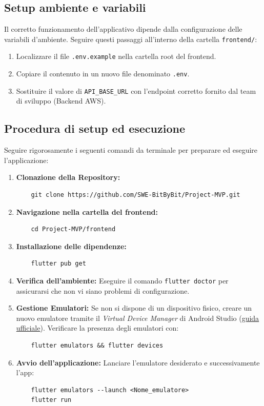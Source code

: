 \documentclass[a4paper,12pt]{article}
\begin{document}
\subsection{Setup ambiente e variabili} \label{subsec:setup_ambiente}
Il corretto funzionamento dell'applicativo dipende dalla configurazione delle variabili d'ambiente. Seguire questi passaggi all'interno della cartella \texttt{frontend/}:
\begin{enumerate}
    \item Localizzare il file \texttt{.env.example} nella cartella root del frontend.
    \item Copiare il contenuto in un nuovo file denominato \texttt{.env}.
    \item Sostituire il valore di \texttt{API\_BASE\_URL} con l'endpoint corretto fornito dal team di sviluppo (Backend AWS).
\end{enumerate}

\subsection{Procedura di setup ed esecuzione} \label{subsec:procedura_esecuzione}
Seguire rigorosamente i seguenti comandi da terminale per preparare ed eseguire l'applicazione:

\begin{enumerate}
    \item \textbf{Clonazione della Repository:}
    {\small
    \begin{verbatim}
    git clone https://github.com/SWE-BitByBit/Project-MVP.git
    \end{verbatim}
    }
    \item \textbf{Navigazione nella cartella del frontend:}
    \begin{verbatim}
    cd Project-MVP/frontend
    \end{verbatim}
    \item \textbf{Installazione delle dipendenze:}
    \begin{verbatim}
    flutter pub get
    \end{verbatim}
    \item \textbf{Verifica dell'ambiente:}
    Eseguire il comando \texttt{flutter doctor} per assicurarsi che non vi siano problemi di configurazione.
    \item \textbf{Gestione Emulatori:}
    Se non si dispone di un dispositivo fisico, creare un nuovo emulatore tramite il \textit{Virtual Device Manager} di Android Studio (\href{https://developer.android.com/studio/run/managing-avds?hl=it}{guida ufficiale}). Verificare la presenza degli emulatori con:
    {\small
    \begin{verbatim}
    flutter emulators && flutter devices
    \end{verbatim}
    }
    \item \textbf{Avvio dell'applicazione:}
    Lanciare l'emulatore desiderato e successivamente l'app:
    {\small
    \begin{verbatim}
    flutter emulators --launch <Nome_emulatore>
    flutter run
    \end{verbatim}
    }
\end{enumerate}
\end{document}
